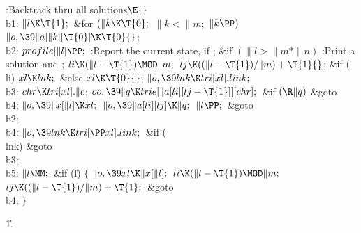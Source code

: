 \Y\B\4:Backtrack thru all solutions\X${}\E{}$\6
\4\\{b1}:\5
${}\|l\K\T{1};{}$\6
\&{for} ${}(\|k\K\T{0};{}$ ${}\|k<\|m;{}$ ${}\|k\PP){}$\1\5
${}\|o,\39\|a[\|k][\T{0}]\K\T{0}{}$;\2\6
\4\\{b2}:\5
${}\\{profile}[\|l]\PP;{}$\6
:Report the current state, if \X;\6
\&{if} ${}(\|l>\|m*\|n){}$\1\5
:Print a solution and \X;\2\6
${}\\{li}\K(\|l-\T{1})\MOD\|m;{}$\6
${}\\{lj}\K((\|l-\T{1})/\|m)+\T{1}{}$;\6
\&{if} (\\{li})\1\5
${}\\{xl}\K\\{lnk};{}$\2\6
\&{else}\1\5
${}\\{xl}\K\T{0}{}$;\2\6
${}\|o,\39\\{lnk}\K\\{tri}[\\{xl}].\\{link};{}$\6
\4\\{b3}:\5
${}\\{chr}\K\\{tri}[\\{xl}].\|c{}$;\6
${}\\{oo},\39\|q\K\\{trie}[\|a[\\{li}][\\{lj}-\T{1}]][\\{chr}];{}$\6
\&{if} ${}(\R\|q){}$\1\5
\&{goto} \\{b4};\2\6
${}\|o,\39\|x[\|l]\K\\{xl};{}$\6
${}\|o,\39\|a[\\{li}][\\{lj}]\K\|q;{}$\6
${}\|l\PP;{}$\6
\&{goto} \\{b2};\6
\4\\{b4}:\5
${}\|o,\39\\{lnk}\K\\{tri}[\PP\\{xl}].\\{link};{}$\6
\&{if} (\\{lnk})\1\5
\&{goto} \\{b3};\2\6
\4\\{b5}:\5
${}\|l\MM;{}$\6
\&{if} (\|l)\5
${}\{{}$\1\6
${}\|o,\39\\{xl}\K\|x[\|l];{}$\6
${}\\{li}\K(\|l-\T{1})\MOD\|m;{}$\6
${}\\{lj}\K((\|l-\T{1})/\|m)+\T{1};{}$\6
\&{goto} \\{b4};\6
\4${}\}{}$\2\par
\U1.\fi

